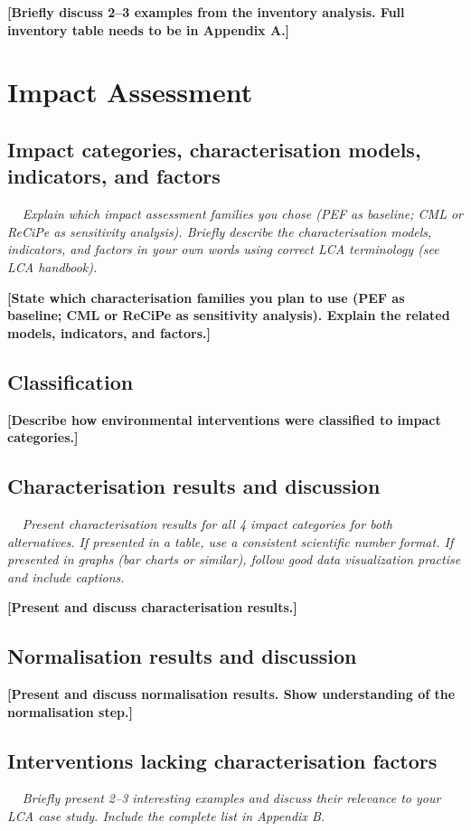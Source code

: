 \documentclass[10pt]{article}
\newcommand{\placeholder}[1]{\textcolor{lcaph}{\textbf{#1}}}    %
\newcommand{\infoicon}{{\setlength{\fboxsep}{1pt}\colorbox{lcablue}{\textcolor{white}{\upshape\bfseries\,i\,}}}}
\newcommand{\guidance}[1]{\par\noindent\colorbox{lcabox}{\parbox{\dimexpr\linewidth-2\fboxsep}{\setlength{\parskip}{2pt}\small\itshape\infoicon\ \color{lcatext}#1}}\par}
\begin{document}
\placeholder{[Briefly discuss 2--3 examples from the inventory analysis. Full inventory table needs to be in Appendix A.]}

\section{Impact Assessment}
\subsection{Impact categories, characterisation models, indicators, and factors}
\guidance{Explain which impact assessment families you chose (PEF as baseline; CML or ReCiPe as sensitivity analysis). Briefly describe the characterisation models, indicators, and factors in your own words using correct LCA terminology (see LCA handbook).}

\placeholder{[State which characterisation families you plan to use (PEF as baseline; CML or ReCiPe as sensitivity analysis). Explain the related models, indicators, and factors.]}

\subsection{Classification}
\placeholder{[Describe how environmental interventions were classified to impact categories.]}

\subsection{Characterisation results and discussion}
\guidance{Present characterisation results for all 4 impact categories for both alternatives. If presented in a table, use a consistent scientific number format. If presented in graphs (bar charts or similar), follow good data visualization practise and include captions.}

\placeholder{[Present and discuss characterisation results.]}

\subsection{Normalisation results and discussion}
\placeholder{[Present and discuss normalisation results. Show understanding of the normalisation step.]}

\subsection{Interventions lacking characterisation factors}
\guidance{Briefly present 2--3 interesting examples and discuss their relevance to your LCA case study. Include the complete list in Appendix B.}
\end{document}
